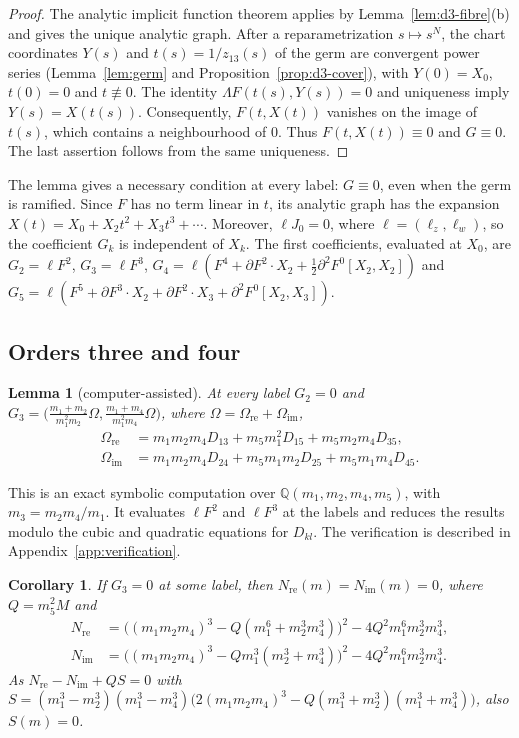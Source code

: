 \documentclass[11pt]{amsart}
\newtheorem{lemma}[theorem]{Lemma}
\newtheorem{corollary}[theorem]{Corollary}
\theoremstyle{definition}
\theoremstyle{remark}
\begin{document}
\begin{proof}
{The analytic implicit function theorem applies by Lemma~\ref{lem:d3-fibre}(b)
and gives the unique analytic graph. After a reparametrization $s\mapsto s^N$,
the chart coordinates $Y(s)$ and $t(s)=1/z_{13}(s)$ of the germ are convergent power series
(Lemma~\ref{lem:germ} and Proposition~\ref{prop:d3-cover}), with $Y(0)=X_0$, $t(0)=0$ and
$t\not\equiv0$. The identity $\Lambda F(t(s),Y(s))=0$ and uniqueness imply
$Y(s)=X(t(s))$. Consequently, $F(t,X(t))$ vanishes on the image of $t(s)$,
which contains a neighbourhood of $0$. Thus $F(t,X(t))\equiv0$ and $G\equiv0$.
The last assertion follows from the same uniqueness.}
\end{proof}

{The lemma gives a necessary condition at every label: $G\equiv0$,
even when the germ is ramified. Since $F$ has no term linear in $t$, its analytic graph has
the expansion $X(t)=X_0+X_2t^2+X_3t^3+\cdots$. Moreover, $\ell J_0=0$, where
$\ell=(\ell_z,\ell_w)$, so the coefficient $G_k$ is independent of $X_k$.
The first coefficients, evaluated at $X_0$, are $G_2=\ell F^2$, $G_3=\ell F^3$,
$G_4=\ell(F^4+\partial F^2\cdot X_2+\tfrac12\partial^2F^0[X_2,X_2])$ and
$G_5=\ell(F^5+\partial F^3\cdot X_2+\partial F^2\cdot X_3+\partial^2F^0[X_2,X_3])$.}

\subsection{Orders three and four}

\begin{lemma}[computer-assisted]\label{lem:d3-order3}
At every label $G_2=0$ and
$G_3=\bigl(\frac{m_1+m_2}{m_1^2m_2}\Omega,\frac{m_1+m_4}{m_1^2m_4}\Omega\bigr)$, where
$\Omega=\Omega_{\mathrm{re}}+\Omega_{\mathrm{im}}$,
\[
\begin{aligned}
\Omega_{\mathrm{re}}&=m_1m_2m_4D_{13}+m_5m_1^2D_{15}+m_5m_2m_4D_{35},\\
\Omega_{\mathrm{im}}&=m_1m_2m_4D_{24}+m_5m_1m_2D_{25}+m_5m_1m_4D_{45}.
\end{aligned}
\]
\end{lemma}

{This is an exact symbolic computation over $\mathbb Q(m_1,m_2,m_4,m_5)$,
with $m_3=m_2m_4/m_1$. It evaluates $\ell F^2$ and $\ell F^3$ at the labels and reduces the
results modulo the cubic and quadratic equations for $D_{kl}$.
The verification is described in Appendix~\ref{app:verification}.}

\begin{corollary}\label{cor:d3-order3}
If $G_3=0$ at some label, then $N_{\mathrm{re}}(m)=N_{\mathrm{im}}(m)=0$, where $Q=m_5^2M$ and
\begin{align*}
N_{\mathrm{re}}&=\bigl((m_1m_2m_4)^3-Q(m_1^6+m_2^3m_4^3)\bigr)^2-4Q^2m_1^6m_2^3m_4^3,\\
N_{\mathrm{im}}&=\bigl((m_1m_2m_4)^3-Qm_1^3(m_2^3+m_4^3)\bigr)^2-4Q^2m_1^6m_2^3m_4^3 .
\end{align*}
As $N_{\mathrm{re}}-N_{\mathrm{im}}+QS=0$ with
$S=(m_1^3-m_2^3)(m_1^3-m_4^3)\bigl(2(m_1m_2m_4)^3-Q(m_1^3+m_2^3)(m_1^3+m_4^3)\bigr)$, also
$S(m)=0$.
\end{corollary}
\end{document}

